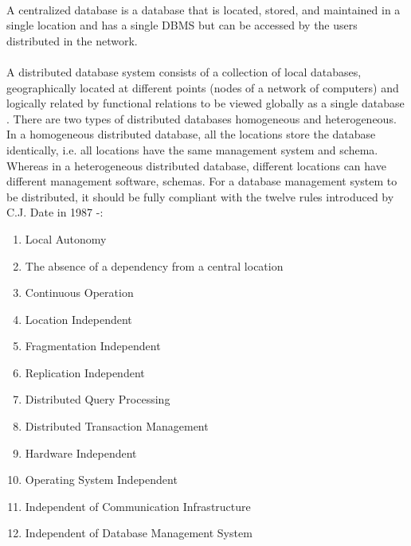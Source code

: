 \documentclass{article}
\begin{document}
        \paragraph{}
        A centralized database is a database that is located, stored, and maintained in a single location and has a single DBMS but can be accessed by the users distributed in the network.
        \paragraph{}
        A distributed database system consists of a collection of local databases,  geographically located at different points (nodes of a network of computers) and  logically related by functional relations to be viewed globally as a single database \cite{distributeddatabase}.
        There are two types of distributed databases homogeneous and heterogeneous. In a homogeneous distributed database, all the locations store the database identically, i.e. all locations have the same management system and schema. Whereas in a heterogeneous distributed database, different locations can have different management software, schemas.
        For a database management system to be distributed, it should be fully compliant with the twelve rules introduced by C.J. Date in 1987 \cite{distributeddbms} -:
        \begin{enumerate}
            \item Local Autonomy
            \item The absence of a dependency from a central location
            \item Continuous Operation
            \item Location Independent
            \item Fragmentation Independent
            \item Replication  Independent
            \item Distributed Query Processing
            \item Distributed Transaction Management
            \item Hardware Independent
            \item Operating System Independent
            \item Independent of Communication  Infrastructure
            \item Independent of Database Management System
        \end{enumerate}
        
\end{document}
